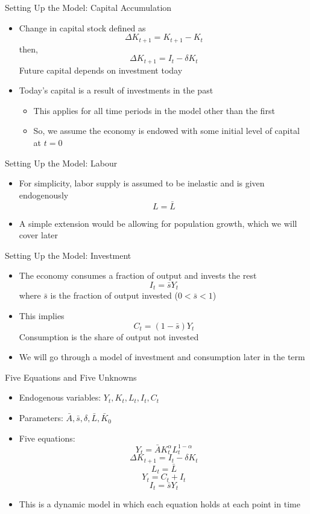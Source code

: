 \documentclass[aspectratio=1610]{beamer}
\begin{document}
\begin{frame}[wide]{Setting Up the Model: Capital Accumulation}
	\begin{itemize}
		\item Change in capital stock defined as
		\[\Delta K_{t+1} =K_{t+1} -K_t \]
		then,
		\[\Delta K_{t+1} = I_t - \delta K_t\]
		Future capital depends on investment today
		\item Today’s capital is a result of investments in the past
		\begin{itemize}
			\item This applies for all time periods in the model other than the first
			\item So, we assume the economy is endowed with some initial level of capital at $t = 0$
		\end{itemize}
	\end{itemize}
\end{frame}

\begin{frame}[wide]{Setting Up the Model: Labour}
	\begin{itemize}
		\item For simplicity, labor supply is assumed to be inelastic and is given endogenously
		\[L=\bar{L}\]
		\item A simple extension would be allowing for population growth, which we will cover later
	\end{itemize}
\end{frame}	

\begin{frame}[wide]{Setting Up the Model: Investment}
	\begin{itemize}
		\item The economy consumes a fraction of output and invests the rest
			\[I_t = \bar{s}Y_t\]
		where $\bar{s}$ is the fraction of output invested ($0<\bar{s}<1$)
		\vspace{4mm}
		\item This implies
		\[C_t = (1-\bar{s})Y_t\]
		Consumption is the share of output not invested
		\item We will go through a model of investment and consumption later in the term
	\end{itemize}
\end{frame}

\begin{frame}[wide]{Five Equations and Five Unknowns}
	\begin{itemize}
		\item Endogenous variables: $Y_t,K_t,L_t,I_t,C_t$
		\item Parameters: $\bar{A}, \bar{s}, \delta, \bar{L}, \bar{K}_0$
		\item Five equations:
			\[Y_t=\bar{A}K_t^{\alpha}L_t^{1-\alpha}\]
			\[\Delta K_{t+1} = I_t - \delta K_t\]
			\[L_t = \bar{L}\]
			\[Y_t = C_t + I_t\]
			\[I_t = \bar{s} Y_t\]
		\item This is a  dynamic model in which each equation holds at each point in time
	\end{itemize}
\end{frame}
\end{document}
